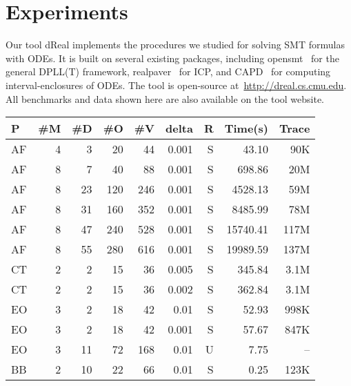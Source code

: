 \documentclass[12pt]{article}
\begin{document}
\section{Experiments}\label{experiments}

Our tool {\sf dReal} implements the procedures we studied for solving SMT formulas with ODEs. It is built on several existing packages, including {\sf opensmt}~\cite{DBLP:conf/tacas/BruttomessoPST10} for the general DPLL(T) framework, {\sf realpaver}~\cite{DBLP:journals/toms/GranvilliersB06} for ICP, and {\sf CAPD}~\cite{capd} for computing interval-enclosures of ODEs. The tool is open-source at~\url{http://dreal.cs.cmu.edu}.  All benchmarks and data shown here are also available on the tool website.
\newcommand{\hmodel}[2]{\href{http://dreal.cs.cmu.edu/#1}{#2}}
{\small
\begin{table}[!th]
  \centering
  \small
  \begin{tabular}{l|r|r|r|r|r|r|r|r}
    \hline
    \hline
    P    & \#M& \#D & \#O & \#V  & delta  & R       & Time(s) & Trace \\
    \hline
    \hline
    AF   & 4     & 3        & 20     & 44      & 0.001     & S & 43.10    & 90K      \\
    AF   & 8     & 7        & 40     & 88      & 0.001     & S & 698.86   & 20M      \\
    AF   & 8     & 23       & 120    & 246     & 0.001     & S & 4528.13  & 59M      \\
    AF   & 8     & 31       & 160    & 352     & 0.001     & S & 8485.99  & 78M      \\
    AF   & 8     & 47       & 240    & 528     & 0.001     & S & 15740.41 & 117M     \\
    AF   & 8     & 55       & 280    & 616     & 0.001     & S & 19989.59 & 137M     \\
    \hline
    \hline
    CT     & 2     & 2        & 15     & 36      & 0.005   & S & 345.84   & 3.1M      \\
    CT     & 2     & 2        & 15     & 36      & 0.002   & S & 362.84   & 3.1M      \\
    \hline
    \hline
    EO     & 3     & 2        & 18     & 42      & 0.01    & S & 52.93    & 998K      \\
    EO     & 3     & 2        & 18     & 42      & 0.001   & S & 57.67    & 847K      \\
    EO     & 3     & 11       & 72     & 168     & 0.01    & U & 7.75     & --       \\
    \hline
    \hline
    BB & 2     & 10       & 22     & 66      & 0.01        & S & 0.25     & 123K       \\


\end{tabular}
\end{table}}
\end{document}
